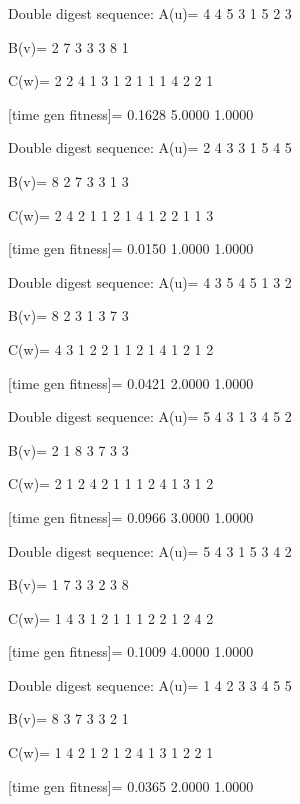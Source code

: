 Double digest sequence:
A(u)=
     4     4     5     3     1     5     2     3

B(v)=
     2     7     3     3     3     8     1

C(w)=
     2     2     4     1     3     1     2     1     1     1     4     2     2     1

[time gen fitness]=
    0.1628    5.0000    1.0000

Double digest sequence:
A(u)=
     2     4     3     3     1     5     4     5

B(v)=
     8     2     7     3     3     1     3

C(w)=
     2     4     2     1     1     2     1     4     1     2     2     1     1     3

[time gen fitness]=
    0.0150    1.0000    1.0000

Double digest sequence:
A(u)=
     4     3     5     4     5     1     3     2

B(v)=
     8     2     3     1     3     7     3

C(w)=
     4     3     1     2     2     1     1     2     1     4     1     2     1     2

[time gen fitness]=
    0.0421    2.0000    1.0000

Double digest sequence:
A(u)=
     5     4     3     1     3     4     5     2

B(v)=
     2     1     8     3     7     3     3

C(w)=
     2     1     2     4     2     1     1     1     2     4     1     3     1     2

[time gen fitness]=
    0.0966    3.0000    1.0000

Double digest sequence:
A(u)=
     5     4     3     1     5     3     4     2

B(v)=
     1     7     3     3     2     3     8

C(w)=
     1     4     3     1     2     1     1     1     2     2     1     2     4     2

[time gen fitness]=
    0.1009    4.0000    1.0000

Double digest sequence:
A(u)=
     1     4     2     3     3     4     5     5

B(v)=
     8     3     7     3     3     2     1

C(w)=
     1     4     2     1     2     1     2     4     1     3     1     2     2     1

[time gen fitness]=
    0.0365    2.0000    1.0000

